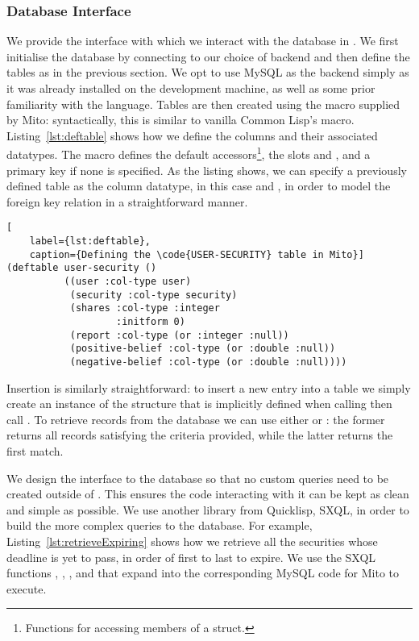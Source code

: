 \subsubsection{Database Interface}

We provide the interface with which we interact with the database in
. We first initialise the database by connecting to our
choice of backend and then define the tables as in the previous section. We opt
to use MySQL as the backend simply as it was already installed on the
development machine, as well as some prior familiarity with the language.
Tables are then created using the  macro supplied by Mito:
syntactically, this is similar to vanilla Common Lisp's  macro.
Listing~\ref{lst:deftable} shows how we define the columns and their associated
datatypes. The macro defines the default accessors\footnote{Functions for
accessing members of a struct.}, the slots  and
, and a primary key  if none is specified. As the
listing shows, we can specify a previously defined table as the column
datatype, in this case  and , in order to model the
foreign key relation in a straightforward manner. 

\begin{lstlisting}[
	label={lst:deftable},
	caption={Defining the \code{USER-SECURITY} table in Mito}]
(deftable user-security ()
          ((user :col-type user)
           (security :col-type security)
           (shares :col-type :integer
                   :initform 0)
           (report :col-type (or :integer :null))
           (positive-belief :col-type (or :double :null))
           (negative-belief :col-type (or :double :null))))
\end{lstlisting}

Insertion is similarly straightforward: to insert a new entry into a table we
simply create an instance of the structure that is implicitly defined when calling
 then call . To retrieve records from the
database we can use either  or : the former
returns all records satisfying the criteria provided, while the latter returns
the first match.

We design the interface to the database so that no custom queries need to be
created outside of . This ensures the code interacting with
it can be kept as clean and simple as possible. We use another library from
Quicklisp, SXQL, in order to build the more complex queries to the database.
For example, Listing~\ref{lst:retrieveExpiring} shows how we retrieve all the
securities whose deadline is yet to pass, in order of first to last to expire.
We use the SXQL functions , \code{:>}, , and
 that expand into the corresponding MySQL code for Mito to execute.

